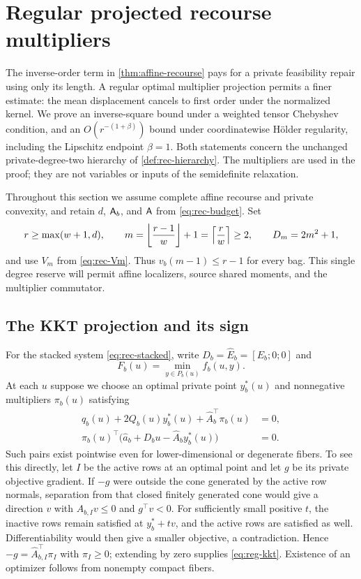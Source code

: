 \section{Regular projected recourse multipliers}\label{sec:regularity}

The inverse-order term in \cref{thm:affine-recourse} pays for a private
feasibility repair using only its length. A regular optimal multiplier
projection permits a finer estimate: the mean displacement cancels to
first order under the normalized kernel. We prove an inverse-square bound
under a weighted tensor Chebyshev condition, and an
$O(r^{-(1+\beta)})$ bound under coordinatewise H\"older regularity,
including the Lipschitz endpoint $\beta=1$. Both statements concern the
unchanged private-degree-two hierarchy of \cref{def:rec-hierarchy}.
The multipliers are used in the proof; they are not variables or inputs
of the semidefinite relaxation.

Throughout this section we assume complete affine recourse and private
convexity, and retain $d$, $\mathsf{A}_b$, and $\mathsf{A}$ from
\eqref{eq:rec-budget}. Set
\begin{equation}\label{eq:reg-parameters}
 r\ge\max(w+1,d),\qquad
 m=\left\lfloor\frac{r-1}{w}\right\rfloor+1
   =\left\lceil\frac rw\right\rceil\ge2,\qquad
 D_m=2m^2+1,
\end{equation}
and use $V_m$ from \eqref{eq:rec-Vm}. Thus
$v_b(m-1)\le r-1$ for every bag. This single degree reserve will permit
affine localizers, source shared moments, and the multiplier commutator.

\subsection{The KKT projection and its sign}\label{sec:reg-kkt}

For the stacked system \eqref{eq:rec-stacked}, write
$D_b=\widehat E_b=[E_b;0;0]$ and
\[
 F_b(u)=\min_{y\in P_b(u)}f_b(u,y).
\]
At each $u$ suppose we choose an optimal private point $y_b^*(u)$ and
nonnegative multipliers $\pi_b(u)$ satisfying
\begin{equation}\label{eq:reg-kkt}
 \begin{split}
 q_b(u)+2Q_b(u)y_b^*(u)+\widehat A_b^\top\pi_b(u)&=0,\\
 \pi_b(u)^\top\bigl(\widehat a_b+D_bu-\widehat A_by_b^*(u)\bigr)&=0.
 \end{split}
\end{equation}
Such pairs exist pointwise even for lower-dimensional or degenerate
fibers. To see this directly, let $I$ be the active rows at an optimal
point and let $g$ be its private objective gradient. If $-g$ were outside
the cone generated by the active row normals, separation from that closed
finitely generated cone would give a direction $v$ with
$\widehat A_{b,I}v\le0$ and $g^\top v<0$. For sufficiently small positive
$t$, the inactive rows remain satisfied at $y_b^*+tv$, and the active
rows are satisfied as well. Differentiability would then give a smaller
objective, a contradiction. Hence $-g=\widehat A_{b,I}^\top\pi_I$ with
$\pi_I\ge0$; extending by zero supplies \eqref{eq:reg-kkt}. Existence of
an optimizer follows from nonempty compact fibers.

